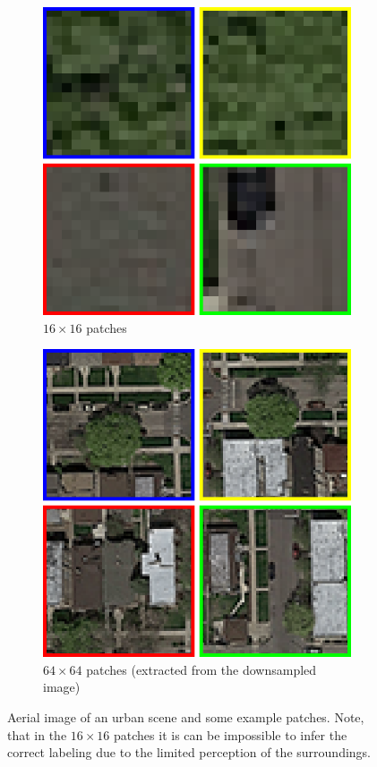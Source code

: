 \documentclass[10pt,conference,compsocconf]{IEEEtran}
\begin{document}
\begin{figure}
\begin{subfigure}[t]{.15\textwidth}
		\includegraphics[width=1\textwidth]{figs/context_size/context16}
		\caption{$ 16 \times 16 $ patches}
	\end{subfigure}
	\begin{subfigure}[t]{.15\textwidth}
		\includegraphics[width=1\textwidth]{figs/context_size/context64_ds}
		\caption{$ 64 \times 64 $ patches (extracted from the downsampled image)}
	\end{subfigure}
	\caption{Aerial image of an urban scene and some example patches. Note, that in the $ 16 \times 16 $ patches it is can be impossible to infer the correct labeling due to the limited perception of the surroundings.}
	\label{fig:context_size}
\end{figure}
\end{document}
